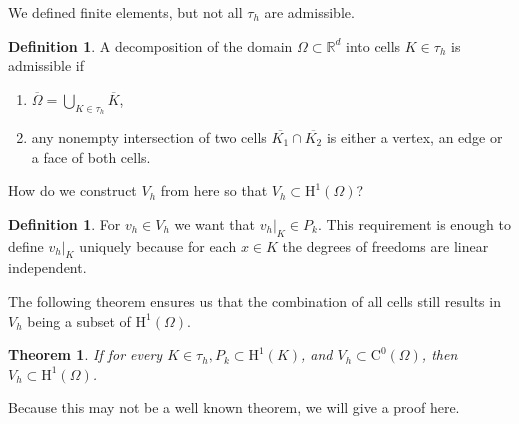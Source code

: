 \documentclass[12pt,a4paper,twoside, open=right]{scrreprt}
\theoremstyle{definition}
\newtheorem{defn}[auf]{Definition}
\theoremstyle{plain}
\newtheorem{sa}[auf]{Theorem}
\newcommand{\rr}{\mathbb{R}}
\begin{document}
    We defined finite elements, but not all $\tau_h$ are admissible.
\begin{defn}
    A decomposition of the domain $\Omega\subset\rr^d$ into cells $K\in\tau_h$ is admissible if
    \begin{enumerate}
        \item $\overline{\Omega}=\bigcup_{K\in\tau_h}\overline{K}$,
        \item any nonempty intersection of two cells $\overline{K_1}\cap\overline{K_2}$ is either a vertex, an edge or a face of both cells.
    \end{enumerate}
\end{defn}
How do we construct $V_h$ from here so that $V_h\subset \mathrm{H}^1(\Omega)$?
\begin{defn}
    For $v_h\in V_h$ we want that $v_h\vert_K\in P_k$. This requirement is enough to define $v_h\vert_K$ uniquely because for each $x\in K$ the degrees of freedoms are linear independent.
\end{defn}
The following theorem ensures us that the combination of all cells still results in $V_h$ being a subset of $\mathrm{H}^1(\Omega)$.
\begin{sa}
    If for every $K\in\tau_h,P_k\subset \mathrm{H}^1(K)$, and $V_h\subset \mathrm{C}^0(\Omega)$, then $V_h\subset \mathrm{H}^1(\Omega)$.
\end{sa}
Because this may not be a well known theorem, we will give a proof here.
\end{document}
